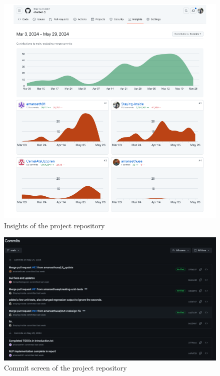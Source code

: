 \begin{figure}[!htbp]
    \centering
    \includegraphics[width=1\linewidth]{Diagrams/Group_work/Github_insights.png}
    \caption{Insights of the project repository}
    \label{fig:insights_github}
\end{figure}

\clearpage

\begin{figure}[!htbp]
    \centering
    \includegraphics[width=1\linewidth]{Diagrams/Group_work/Github_commit_page.png}
    \caption{Commit screen of the project repository}
    \label{fig:commit_github}
\end{figure}


